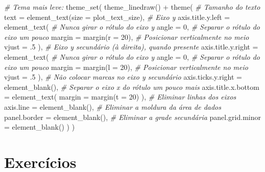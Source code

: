 \documentclass[
  11pt]{report}
\newenvironment{Shaded}{\begin{snugshade}}{\end{snugshade}}
\newcommand{\AttributeTok}[1]{\textcolor[rgb]{0.77,0.63,0.00}{#1}}
\newcommand{\CommentTok}[1]{\textcolor[rgb]{0.56,0.35,0.01}{\textit{#1}}}
\newcommand{\DecValTok}[1]{\textcolor[rgb]{0.00,0.00,0.81}{#1}}
\newcommand{\FunctionTok}[1]{\textcolor[rgb]{0.00,0.00,0.00}{#1}}
\newcommand{\NormalTok}[1]{#1}
\newcommand{\SpecialCharTok}[1]{\textcolor[rgb]{0.00,0.00,0.00}{#1}}
\renewenvironment{Shaded}{
    \begin{mdframed}[%
      roundcorner=2pt,%
      innerleftmargin=5pt,%
      innerrightmargin=5pt,%
      topline=true,%
      leftline=true,%
      rightline=true,%
      bottomline=true,%
      linewidth=0.5pt,%
      linecolor=black!20,%
      backgroundcolor=black!2,%
      skipabove=2ex,%
      skipbelow=2.5ex%
    ]%
  }
  {
    \end{mdframed}
  }
\begin{document}
\begin{itemize}
\begin{Shaded}
\begin{Highlighting}[]
\CommentTok{\# Tema mais leve:}
\FunctionTok{theme\_set}\NormalTok{(}
  \FunctionTok{theme\_linedraw}\NormalTok{() }\SpecialCharTok{+}
    \FunctionTok{theme}\NormalTok{(}
      \CommentTok{\# Tamanho do texto}
      \AttributeTok{text =} \FunctionTok{element\_text}\NormalTok{(}\AttributeTok{size =}\NormalTok{ plot\_text\_size),}
      \CommentTok{\# Eixo y}
      \AttributeTok{axis.title.y.left =} \FunctionTok{element\_text}\NormalTok{(}
        \CommentTok{\# Nunca girar o rótulo do eixo y}
        \AttributeTok{angle =} \DecValTok{0}\NormalTok{,}
        \CommentTok{\# Separar o rótulo do eixo um pouco}
        \AttributeTok{margin =} \FunctionTok{margin}\NormalTok{(}\AttributeTok{r =} \DecValTok{20}\NormalTok{),}
        \CommentTok{\# Posicionar verticalmente no meio}
        \AttributeTok{vjust =}\NormalTok{ .}\DecValTok{5}
\NormalTok{      ),}
      \CommentTok{\# Eixo y secundário (à direita), quando presente}
      \AttributeTok{axis.title.y.right =} \FunctionTok{element\_text}\NormalTok{(}
        \CommentTok{\# Nunca girar o rótulo do eixo y}
        \AttributeTok{angle =} \DecValTok{0}\NormalTok{,}
        \CommentTok{\# Separar o rótulo do eixo um pouco}
        \AttributeTok{margin =} \FunctionTok{margin}\NormalTok{(}\AttributeTok{l =} \DecValTok{20}\NormalTok{),}
        \CommentTok{\# Posicionar verticalmente no meio}
        \AttributeTok{vjust =}\NormalTok{ .}\DecValTok{5}
\NormalTok{      ),}
      \CommentTok{\# Não colocar marcas no eixo y secundário}
      \AttributeTok{axis.ticks.y.right =} \FunctionTok{element\_blank}\NormalTok{(),}
      \CommentTok{\# Separar o eixo x do rótulo um pouco mais}
      \AttributeTok{axis.title.x.bottom =} \FunctionTok{element\_text}\NormalTok{(}
        \AttributeTok{margin =} \FunctionTok{margin}\NormalTok{(}\AttributeTok{t =} \DecValTok{20}\NormalTok{)}
\NormalTok{      ),}
      \CommentTok{\# Eliminar linhas dos eixos}
      \AttributeTok{axis.line =} \FunctionTok{element\_blank}\NormalTok{(),}
      \CommentTok{\# Eliminar a moldura da área de dados}
      \AttributeTok{panel.border =} \FunctionTok{element\_blank}\NormalTok{(),}
      \CommentTok{\# Eliminar a grade secundária}
      \AttributeTok{panel.grid.minor =} \FunctionTok{element\_blank}\NormalTok{()}
\NormalTok{    )}
\NormalTok{)}
\end{Highlighting}
\end{Shaded}
\end{itemize}

\hypertarget{exercuxedcios-5}{%
\section{Exercícios}\label{exercuxedcios-5}}
\end{document}
